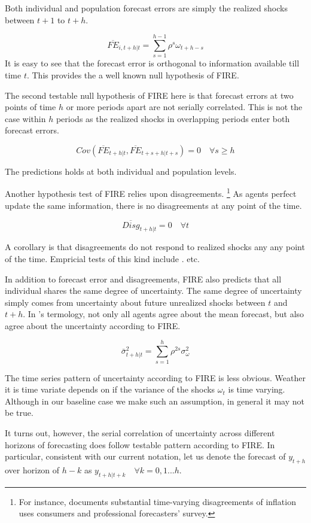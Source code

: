 \documentclass[]{article}
\begin{document}
Both individual and population forecast errors are simply the realized shocks between $t+1$ to $t+h$.  

$$\overline{FE}_{i,t+h|t} = \sum^{h-1}_{s=1} \rho^s \omega_{t+h-s}$$ It is easy to see that the forecast error is orthogonal to information available till time $t$. This provides the a well known null hypothesis of FIRE. \cite{xx}

The second testable null hypothesis of FIRE here is that forecast errors at two points of time $h$ or more periods apart are not serially correlated. This is not the case within $h$ periods as the realized shocks in overlapping periods enter both forecast errors. 

$$Cov(\overline{FE}_{t+h|t}, \overline{FE}_{t+s+h|t+s}) = 0 \quad \forall s \geq h$$

The predictions holds at both individual and population levels. 

Another hypothesis test of FIRE relies upon disagreements. \footnote{For instance, \cite{mankiw2003disagreement} documents substantial time-varying disagreements of inflation uses consumers and professional forecasters' survey. } As agents perfect update the same information, there is no disagreements at any point of the time. 

$$\overline{Disg}_{t+h|t}=0 \quad \forall t$$

A corollary is that disagreements do not respond to realized shocks any any point of the time.  Empricial tests of this kind include \cite{xx}.\cite{xx} etc. 

In addition to forecast error and disagreements, FIRE also predicts that all individual shares the same degree of uncertainty. The same degree of uncertainty simply comes from uncertainty about future unrealized shocks between $t$ and $t+h$. In \cite{}'s termology, not only all agents agree about the mean forecast, but also agree about the uncertainty according to FIRE. 

$$\bar \sigma^2_{t+h|t} = \sum^{h}_{s=1}\rho^{2s} \sigma^2_{\omega}$$

The time series pattern of uncertainty according to FIRE is less obvious. Weather it is time variate depends on if the variance of the shocks $\omega_t$ is time varying. Although in our baseline case we make such an assumption, in general it may not be true. 

It turns out, however, the serial correlation of uncertainty across different horizons of forecasting does follow testable pattern according to FIRE. In particular, consistent with our current notation, let us denote the forecast of $y_{t+h}$ over horizon of $h-k$ as $y_{t+h|t+k} \quad \forall k =0,1...h$. 
\end{document}
